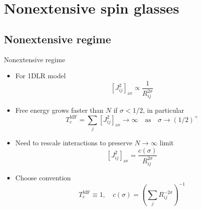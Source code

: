 \documentclass{beamer}
\newcommand{\del}[1]{\left(#1\right)}
\newcommand{\sbr}[1]{\left[#1\right]}
\newcommand{\dav}[1]{\sbr{#1}_{\text{av}}}
\begin{document}
\section{Nonextensive spin glasses}

\subsection{Nonextensive regime}

\begin{frame}{Nonextensive regime}
  \begin{itemize}
    \item For 1DLR model
    \begin{equation*}
      \dav{J_{ij}^2} \propto \frac{1}{R_{ij}^{2\sigma}}
    \end{equation*}
    \item Free energy grows faster than $N$ if $\sigma<1/2$, in particular
      \begin{equation*}
        T_c^{\text{MF}} = \sum_j \dav{J_{ij}^2} \to \infty
        \quad\text{as}\quad
        \sigma \to (1/2)^+
      \end{equation*}
    \item Need to rescale interactions to preserve $N\to\infty$ limit
      \begin{equation*}
        \dav{J_{ij}^2} = \frac{c(\sigma)}{R_{ij}^{2\sigma}}
      \end{equation*}
    \item Choose convention
      \begin{equation*}
        T_c^{\text{MF}} \equiv 1,\quad
        c(\sigma) = \del{\sum_j R_{ij}^{-2\sigma}}^{-1}
      \end{equation*}
  \end{itemize}
\end{frame}
\end{document}
